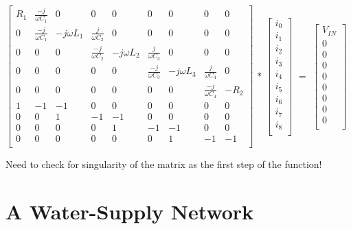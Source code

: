 \documentclass[11pt,a4paper]{article}
\begin{document}
$\begin{bmatrix*}
	R_{1} & \frac{-j}{\omega C_{1}} & 0 & 0 & 0 & 0 & 0 & 0 & 0 \\
	0 & \frac{-j}{\omega C_{1}} & -j \omega L_{1} & \frac{j}{\omega C_{2}} & 0 & 0 & 0 & 0 & 0\\
	0 & 0 &  0 & \frac{-j}{\omega C_{2}} & -j \omega L_{2} & \frac{j}{\omega C_{3}} & 0 & 0 & 0\\
	0 & 0 & 0 & 0 & 0 & \frac{-j}{\omega C_{3}} & -j \omega L_{3} & \frac{j}{\omega C_{4}} & 0\\
	0 & 0 & 0 & 0 & 0 & 0 & 0 & \frac{-j}{\omega C_{4}} & -R_{2}\\
	1 & -1 & -1 & 0 & 0 & 0 & 0 & 0 & 0\\
	0 & 0 & 1 & -1 & -1 & 0 & 0 & 0 & 0\\
	0 & 0 & 0 & 0 & 1 & -1 & -1 & 0 & 0\\
	0 & 0 & 0 & 0 & 0 & 0 & 1 & -1 & -1\\
\end{bmatrix*}$
$ * $
$\begin{bmatrix}
	i_{0}\\
	i_{1}\\
	i_{2}\\
	i_{3}\\
	i_{4}\\
	i_{5}\\
	i_{6}\\
	i_{7}\\
	i_{8}\\
\end{bmatrix}$ 
$ = $
$\begin{bmatrix}
	V_{IN}\\
	0\\
	0\\
	0\\
	0\\
	0\\
	0\\
	0\\
	0\\
\end{bmatrix}$

Need to check for singularity of the matrix as the first step of the function!
\newpage

\section{A Water-Supply Network}
\end{document}
